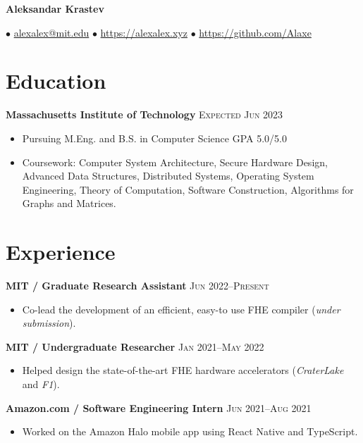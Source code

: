 \documentclass[letterpaper,11pt]{article}
\author{Aleksandar Krastev}
\begin{document}
\setlength{\belowdisplayskip}{\parskip}
\setlength{\belowdisplayshortskip}{\belowdisplayskip}
\setlength{\abovedisplayskip}{\parskip}
\setlength{\abovedisplayshortskip}{\abovedisplayskip}

\centerline{{\Huge \bf Aleksandar Krastev}}
$\bullet$ \href{mailto:alexalex@mit.edu}{alexalex@mit.edu} \hfill
$\bullet$ \href{https://alexalex.xyz}{https://alexalex.xyz} \hfill
$\bullet$ \href{https://github.com/Alaxe}{https://github.com/Alaxe} \hfill

\section*{Education}
\textbf{Massachusetts Institute of Technology}
\hfill
\textsc{Expected Jun 2023}

\begin{itemize}
    \item Pursuing M.Eng. and B.S. in Computer Science
        \hfill \textsc{GPA 5.0/5.0}
    \item Coursework:
        Computer System Architecture,
        Secure Hardware Design,
        Advanced Data Structures,
        Distributed Systems,
        Operating System Engineering,
        Theory of Computation,
        Software Construction,
        Algorithms for Graphs and Matrices.
\end{itemize}



\section*{Experience}
\textbf{MIT / Graduate Research Assistant}
\hfill
\textsc{Jun 2022--Present}
\begin{itemize}
    \item Co-lead the development of an efficient, easy-to use FHE compiler
        (\emph{under submission}).
\end{itemize}

\textbf{MIT / Undergraduate Researcher}
\hfill
\textsc{Jan 2021--May 2022}
\begin{itemize}
    \item Helped design the state-of-the-art FHE hardware accelerators
        (\emph{CraterLake} and \emph{F1}).
\end{itemize}

\textbf{Amazon.com / Software Engineering Intern}
\hfill
\textsc{Jun 2021--Aug 2021}
\begin{itemize}
    \item Worked on the Amazon Halo mobile app using React Native and TypeScript.
\end{itemize}
\end{document}
